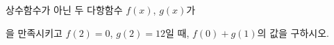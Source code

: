 상수함수가 아닌 두 다항함수 $f(x)$, $g(x)$가 \par\smallskip{}\par\smallskip\noindent 을 만족시키고 $f(2)=0$, $g(2)=12$일 때, $f(0)+g(1)$의 값을 구하시오.
